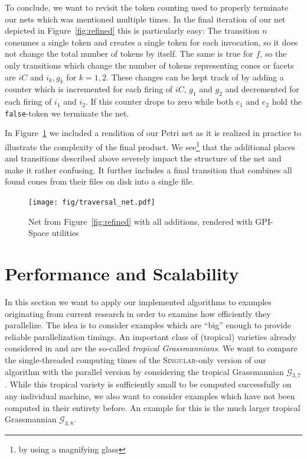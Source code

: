 \documentclass[
  paper=a4,
  titlepage,
  bibliography=totoc,
  pagesize=pdftex
]{scrartcl}
\numberwithin{figure}{section}
\numberwithin{equation}{section}
\numberwithin{table}{section}
\theoremstyle{definition}
\numberwithin{definition}{section}
\begin{document}
To conclude, we want to revisit the token counting used to properly terminate our nets
which was mentioned multiple times. In the final iteration of our net depicted in
Figure~\ref{fig:refined} this is particularly easy: The transition $n$ consumes a single
token and creates a single token for each invocation, so it does not change the total
number of tokens by itself. The same is true for $f$, so the only transitions which change
the number of tokens representing cones or facets are $iC$ and $i_k, g_k$ for $k=1,2$.
These changes can be kept track of by adding a counter which is incremented for each
firing of $iC$, $g_1$ and $g_2$ and decremented for each firing of $i_1$ and $i_2$. If
this counter drops to zero while both $e_1$ and $e_2$ hold the \texttt{false}-token we
terminate the net.

In Figure~\ref{fig:full_net} we included a rendition of our Petri net as it is realized in
practice to illustrate the complexity of the final product. We see\footnote{by using a
magnifying glass} that the additional places and transitions described above severely
impact the structure of the net and make it rather confusing. It further includes a final
transition that combines all found cones from their files on disk into a single file.

\begin{figure}[htbp]
  \texttt{[image: fig/traversal\_net.pdf]}
  \caption{Net from Figure~\ref{fig:refined} with all additions, rendered with GPI-Space
  utilities}
  \label{fig:full_net}
\end{figure}

\section{Performance and Scalability}

In this section we want to apply our implemented algorithms to examples originating from
current research in order to examine how efficiently they parallelize. The idea is to
consider examples which are \enquote{big} enough to provide reliable parallelization
timings. An important class of (tropical) varieties already considered in
\cite{tropPointsLinks} and \cite{tropGrass} are the so-called \emph{tropical
Grassmannians}. We want to compare the single-threaded computing times of the
\textsc{Singular}-only version of our algorithm with the parallel version by considering
the tropical Grassmannian $\mathcal G_{3,7}$. While this tropical variety is sufficiently
small to be computed successfully on any individual machine, we also want to consider
examples which have not been computed in their entirety before. An example for this is the
much larger tropical Grassmannian $\mathcal G_{3,8}$.
\end{document}
